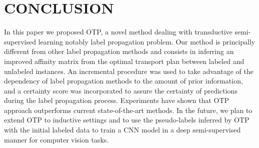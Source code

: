 \documentclass[conference]{IEEEtran}
\begin{document}
\section{CONCLUSION}
In this paper we proposed OTP, a novel method dealing with transductive semi-supervised learning notably label propagation problem. Our method is principally different from other label propagation methods and consists in inferring an improved affinity matrix from the optimal transport plan between labeled and unlabeled instances. An incremental procedure was used to take advantage of the dependency of label propagation methods to the amount of prior information, and a certainty score was incorporated to assure the certainty of predictions during the label propagation process. Experiments have shown that OTP approach outperforms current state-of-the-art methods. In the future, we plan to extend OTP to inductive settings and to use the pseudo-labels inferred by OTP with the initial labeled data to train a CNN model in a deep semi-supervised  manner for computer vision tasks.


\end{document}
